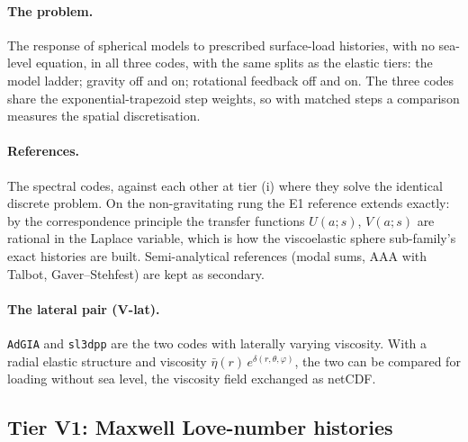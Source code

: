 \documentclass[11pt]{article}
\numberwithin{equation}{section}
\newcommand{\code}[1]{\texttt{#1}}
\begin{document}
\paragraph{The problem.} The response of spherical models to prescribed
surface-load histories, with no sea-level equation, in all three codes,
with the same splits as the elastic tiers: the model ladder; gravity off and
on; rotational feedback off and on. The three codes share the
exponential-trapezoid step weights, so with matched steps a comparison
measures the spatial discretisation.

\paragraph{References.} The spectral codes, against each other at tier
(i) where they solve the identical discrete problem. On the non-gravitating
rung the E1 reference extends exactly: by the correspondence principle the
transfer functions $U(a;s)$, $V(a;s)$ are rational in the Laplace variable,
which is how the viscoelastic sphere sub-family's exact histories are built.
Semi-analytical references (modal sums, AAA with Talbot, Gaver--Stehfest)
are kept as secondary.

\paragraph{The lateral pair (V-lat).} \code{AdGIA} and \code{sl3dpp} are the
two codes with laterally varying viscosity. With a radial elastic structure
and viscosity $\bar\eta(r)\,e^{\delta(r,\theta,\varphi)}$, the two can be
compared for loading without sea level, the viscosity field exchanged as
netCDF.

\subsection{Tier V1: Maxwell Love-number histories}
\label{sec:v1}
\end{document}
